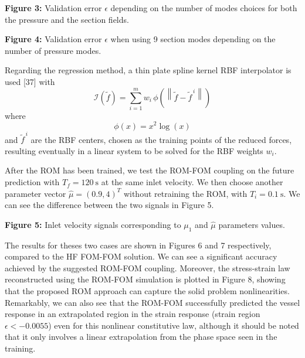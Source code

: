 \documentclass[11pt]{article}
\begin{document}
\begin{center}
\textbf{Figure 3:} Validation error $\epsilon$ depending on the number of modes choices for both the pressure and the section fields.
\end{center}

\begin{center}
\textbf{Figure 4:} Validation error $\epsilon$ when using 9 section modes depending on the number of pressure modes.
\end{center}

Regarding the regression method, a thin plate spline kernel RBF interpolator is used [37] with
\begin{equation}
\tag{27}
\mathcal{I}(\tilde{f}) = \sum_{i=1}^{m} w_i \,\phi\!\left(\left\|\tilde{f} - \tilde{f}^{\,i}\right\|\right)
\end{equation}
where
\begin{equation}
\tag{28}
\phi(x) = x^2 \log(x)
\end{equation}
and $\tilde{f}^{\,i}$ are the RBF centers, chosen as the training points of the reduced forces, resulting eventually in a linear system to be solved for the RBF weights $w_i$.

After the ROM has been trained, we test the ROM-FOM coupling on the future prediction with $T_f = 120\ \mathrm{s}$ at the same inlet velocity. We then choose another parameter vector $\hat{\mu} = (0.9,4)^T$ without retraining the ROM, with $T_i = 0.1\ \mathrm{s}$. We can see the difference between the two signals in Figure 5.

\begin{center}
\textbf{Figure 5:} Inlet velocity signals corresponding to $\mu_1$ and $\hat{\mu}$ parameters values.
\end{center}

The results for theses two cases are shown in Figures 6 and 7 respectively, compared to the HF FOM-FOM solution. We can see a significant accuracy achieved by the suggested ROM-FOM coupling. Moreover, the stress-strain law reconstructed using the ROM-FOM simulation is plotted in Figure 8, showing that the proposed ROM approach can capture the solid problem nonlinearities. Remarkably, we can also see that the ROM-FOM successfully predicted the vessel response in an extrapolated region in the strain response (strain region $\epsilon < -0.0055$) even for this nonlinear constitutive law, although it should be noted that it only involves a linear extrapolation from the phase space seen in the training.
\end{document}
